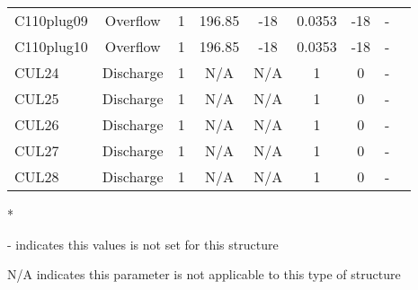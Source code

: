 \begin{table}[h]
\begin{tabular}{@{}lcccccccc@{}}
{C110plug09}    & Overflow      & 1        & 196.85      & -18          & 0.0353      & -18             & -            \\
{C110plug10}    & Overflow      & 1        & 196.85      & -18          & 0.0353      & -18             & -            \\
{CUL24}         & Discharge     & 1        & N/A         & N/A          & 1           & 0               & -            \\
{CUL25}         & Discharge     & 1        & N/A         & N/A          & 1           & 0               & -            \\
{CUL26}         & Discharge     & 1        & N/A         & N/A          & 1           & 0               & -            \\
{CUL27}         & Discharge     & 1        & N/A         & N/A          & 1           & 0               & -            \\
{CUL28}         & Discharge     & 1        & N/A         & N/A          & 1           & 0               & -            \\
\hline
\end{tabular}

* \cite{corp2005}

- indicates this values is not set for this structure

N/A indicates this parameter is not applicable to this type of structure
\end{table}
\normalsize

